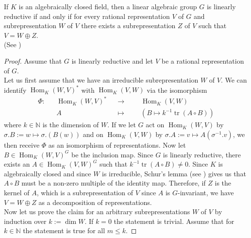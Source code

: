 \begin{theorem}\label{decomp}
  If $K$ is an algebraically closed field, then a linear algebraic group $G$ is linearly reductive if and only if for every rational representation $V$ of $G$ and subrepresentation $W$ of $V$ there exists a subrepresentation $Z$ of $V$ such that $V = W \oplus Z$.  \\
  (See \cite[2.2.5]{DK15})
\end{theorem}

\begin{proof}
  Assume that $G$ is linearly reductive and let $V$ be a rational representation of $G$.\\
  Let us first assume that we have an irreducible subrepresentation $W$ of $V$.
  We can identify $\operatorname{Hom}_K(W,V)^\ast$ with $\operatorname{Hom}_K(V,W)$ via the isomorphism
  \begin{equation}
    \begin{aligned}
      \Phi \colon &&\operatorname{Hom}_K(W,V)^\ast&&\longrightarrow&&& \operatorname{Hom}_K(V,W)  \\
      &&A && \longmapsto&&& (B \mapsto k^{-1}\operatorname{tr}(A \circ B))
    \end{aligned}
  \end{equation}
where $k \in \mathbb{N}$ is the dimension of $W$.
  If we let $G$ act on $ \operatorname{Hom}_K(W,V)$ by \linebreak$\sigma.B :=  w \mapsto \sigma . (B(w))$ and on $\operatorname{Hom}_K(V,W)$ by $ \sigma.A := v \mapsto A(\sigma^{-1}.v) $, we then receive $\Phi$ as an isomorphism of representations. %
  Now let $B \in \operatorname{Hom}_K(W,V)^G$ be the inclusion map.
  Since $G$ is linearly reductive, there exists an \linebreak$A \in \operatorname{Hom}_K(V,W)^G$ such that $k^{-1} \operatorname{tr}(A \circ B) \neq 0$.
  Since $K$ is algebraically closed and since $W$ is irreducible, Schur's lemma (see \cite[1.7]{FH91}) gives us that $A \circ B$ must be a non-zero multiple of the identity map.
  Therefore, if $Z$ is the kernel of $A$, which is a subrepresentation of $V$ since $A$ is $G$-invariant, we have $V = W \oplus Z$ as a decomposition of representations.  \\
  Now let us prove the claim for an arbitrary subrepresentations $W$ of $V$ by induction over $k := \operatorname{dim}W$.
  If $k=0$ the statement is trivial.
  Assume that for $k \in \mathbb{N}$ the statement is true for all $m \leq k$.

\end{proof}
